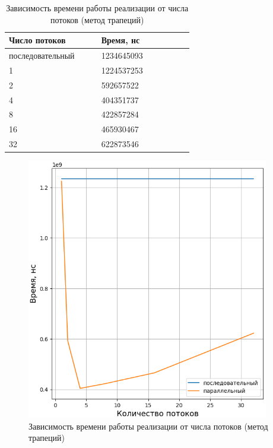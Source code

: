 \clearpage

\begin{table}[h]
    \begin{center}
    \begin{threeparttable}
        \captionsetup{justification=raggedright}
        \caption{\label{tab:threads-trapez}Зависимость времени работы реализации от числа потоков (метод трапеций)}
        \begin{tabular}{|p{0.4\linewidth}|p{0.4\linewidth}|}
            \hline
            \bfseries Число потоков & \bfseries Время, нс \\
            \hline
            последовательный & 1234645093 \\
            \hline
            1 & 1224537253 \\
            \hline
            2 & 592657522 \\
            \hline
            4 & 404351737 \\
            \hline
            8 & 422857284 \\
            \hline
            16 & 465930467 \\
            \hline
            32 & 622873546 \\
            \hline
        \end{tabular}
    \end{threeparttable}
    \end{center}
\end{table} 

\begin{figure}[h!btp]
	\centering
	\includegraphics[width=300pt]{inc/gr3.png}
	\caption{Зависимость времени работы реализации от числа потоков (метод трапеций)}
	\label{fig:gr3}	
\end{figure}

